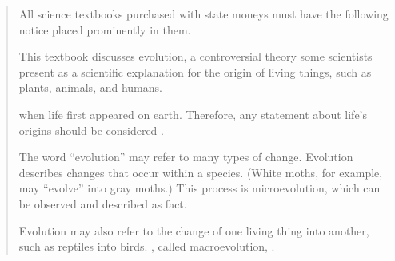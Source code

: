 \begin{frame}
    \begin{quote}
        \small
        All science textbooks purchased with state moneys must have the
        following notice placed prominently in them.

        This textbook discusses evolution, a controversial theory some
        scientists present as a scientific explanation for the origin of living
        things, such as plants, animals, and humans. 

         when life first appeared on earth.
        Therefore, any statement about life’s origins should be considered
        .

        The word ``evolution'' may refer to many types of change. Evolution
        describes changes that occur within a species. (White moths, for
        example, may ``evolve'' into gray moths.) This process is
        microevolution, which can be observed and described as fact. 

        Evolution may also refer to the change of one living thing into
        another, such as reptiles into birds. , called
        macroevolution, .
    \end{quote}
\end{frame}


